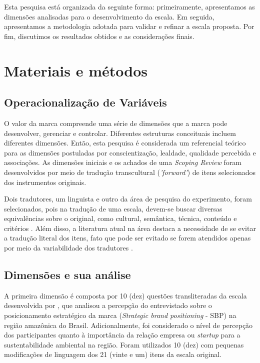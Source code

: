 Esta pesquisa está organizada da seguinte forma: primeiramente, apresentamos as dimensões analisadas para o desenvolvimento da escala. Em seguida, apresentamos a metodologia adotada para validar e refinar a escala proposta. Por fim, discutimos os resultados obtidos e as considerações finais.


\section{Materiais e métodos}

\subsection{Operacionalização de Variáveis}

O valor da marca compreende uma série de dimensões que a marca pode desenvolver, gerenciar e controlar. Diferentes estruturas conceituais incluem diferentes dimensões. Então, esta pesquisa é considerada um referencial teórico para as dimensões postuladas por conscientização, lealdade, qualidade percebida e associações. As dimensões iniciais e os achados de uma \textit{Scoping Review} foram desenvolvidos por meio de tradução transcultural (\textit{'forward'}) de itens selecionados dos instrumentos originais. \cite{Aaker1997DimensionsPersonality}

Dois tradutores, um linguista e outro da área de pesquisa do experimento, foram selecionados, pois na tradução de uma escala, devem-se buscar diversas equivalências sobre o original, como cultural, semântica, técnica, conteúdo e critérios \cite{Guillemin1993Cross-culturalGuidelines}. Além disso, a literatura atual na área destaca a necessidade de se evitar a tradução literal dos itens, fato que pode ser evitado se forem atendidos apenas por meio da variabilidade dos tradutores \cite{Callegaro2018}.

\subsection{Dimensões e sua análise}

A primeira dimensão é composta por 10 (dez) questões transliteradas da escala desenvolvida por , que analisou a percepção do entrevistado sobre o posicionamento estratégico da marca (\textit{Strategic brand positioning} - SBP) na região amazônica do Brasil. Adicionalmente, foi considerado o nível de percepção dos participantes quanto à importância da relação empresa ou \textit{startup} para a sustentabilidade ambiental na região. Foram utilizados 10 (dez) com pequenas modificações de linguagem dos 21 (vinte e um) itens da escala original.

